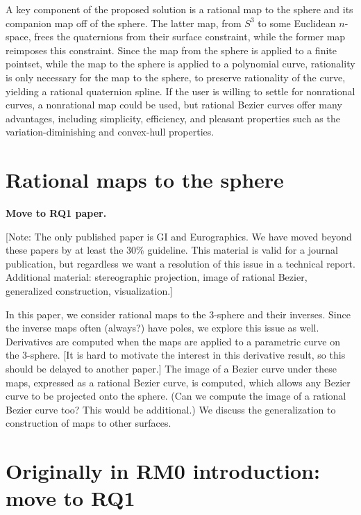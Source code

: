 \documentclass[12pt]{article}
\begin{document}
A key component of the proposed solution is a rational map to the sphere
and its companion map off of the sphere.
The latter map, from $S^3$ to some Euclidean $n$-space, frees the quaternions from
their surface constraint, while the former map reimposes this constraint.
Since the map from the sphere is applied to a finite pointset, while the map
to the sphere is applied to a polynomial curve, rationality is only necessary for the
map to the sphere, to preserve rationality of the curve, yielding a rational
quaternion spline.
If the user is willing to settle for nonrational curves,
a nonrational map could be used,
but rational Bezier curves offer many advantages, including simplicity,
efficiency, and pleasant properties such as the variation-diminishing and convex-hull
properties.

\section{Rational maps to the sphere}

{\bf Move to RQ1 paper.}

[Note: The only published paper is GI and Eurographics.
We have moved beyond these papers by at least the 30\% guideline.
This material is valid for a journal publication, but regardless we want a resolution
of this issue in a technical report.
Additional material: stereographic projection, image of rational Bezier,
generalized construction, visualization.]

In this paper, we consider rational maps to the 3-sphere and their inverses.
Since the inverse maps often (always?) have poles, we explore this issue as well.
Derivatives are computed when the maps are applied to a parametric curve on 
the 3-sphere.
[It is hard to motivate the interest in this derivative result, so this should
be delayed to another paper.]
The image of a Bezier curve under these maps, expressed as a rational Bezier curve,
is computed, which allows any Bezier curve to be projected onto the sphere.
(Can we compute the image of a rational Bezier curve too? This would be additional.)
We discuss the generalization to construction of maps to other surfaces.

\section{Originally in RM0 introduction: move to RQ1}
\end{document}
